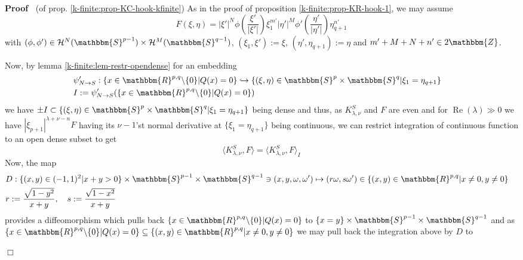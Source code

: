 \documentclass{article}
\newcommand{\assign}{:=}
\newcommand{\tmop}[1]{\ensuremath{\operatorname{#1}}}
\newenvironment{proof}{\noindent\textbf{Proof\ }}{\hspace*{\fill}$\Box$\medskip}
\numberwithin{definition}{section}
\numberwithin{lemma}{section}
\numberwithin{proposition}{section}
{\theorembodyfont{\rmfamily}\newtheorem{remark}{Remark}
\numberwithin{remark}{section}
}
\begin{document}
\begin{proof}
  (of prop. \ref{k-finite:prop-KC-hook-kfinite}) As in the proof of
  proposition \ref{k-finite:prop-KR-hook-1}, we may assume
  \[ F ( \xi, \eta) = | \xi' |^N \phi \left( \frac{\xi'}{| \xi' |} \right)
     \xi_1^{m'} | \eta' |^M \phi' \left( \frac{\eta'}{| \eta' |} \right)
     \eta_{q + 1}^{n'} \]
  with $( \phi, \phi') \in \mathcal{H}^N ( \mathbbm{S}^{p - 1}) \times
  \mathcal{H}^M ( \mathbbm{S}^{q - 1})$, $( \xi_1, \xi') \assign \xi$, $(
  \eta', \eta_{q + 1}) \assign \eta$ and $m' + M + N + n' \in 2\mathbbm{Z}$.
  
  Now, by lemma \ref{k-finite:lem-restr-opendense} for an embedding
  \begin{eqnarray}
    & \psi_{N \rightarrow S}' : \{ x \in \mathbbm{R}^{p, q} \backslash \{ 0
    \} | Q ( x) = 0 \} \hookrightarrow \{ ( \xi, \eta) \in \mathbbm{S}^p
    \times \mathbbm{S}^q | \xi_1 = \eta_{q + 1} \} &  \nonumber\\
    & I \assign \psi'_{N \rightarrow S} ( \{ x \in \mathbbm{R}^{p, q}
    \backslash \{ 0 \} | Q ( x) = 0 \}) &  \nonumber
  \end{eqnarray}
  we have $\pm I \subset \{ ( \xi, \eta) \in \mathbbm{S}^p \times
  \mathbbm{S}^q | \xi_1 = \eta_{q + 1} \}$ being dense and thus, as
  $K_{\lambda, \nu}^S$ and $F$ are even and for $\tmop{Re} ( \lambda) \gg 0$
  we have $| \xi_{p + 1} |^{\lambda + \nu - n} F$ having its $\nu - 1$'st
  normal derivative at $\{ \xi_1 = \eta_{q + 1} \}$ being continuous, we can
  restrict integration of continuous function to an open dense subset to get
  \[ \langle K_{\lambda, \nu}^S, F \rangle = \langle K_{\lambda, \nu}^S, F
     \rangle_I \]
  Now, the map
  \begin{eqnarray}
    & D : \{ ( x, y) \in ( - 1, 1)^2 | x + y > 0 \} \times \mathbbm{S}^{p -
    1} \times \mathbbm{S}^{q - 1} \ni ( x, y, \omega, \omega') \mapsto ( r
    \omega, s \omega') \in \{ ( x, y) \in \mathbbm{R}^{p, q} | x \neq 0, y
    \neq 0 \} &  \nonumber\\
    & r : = \frac{\sqrt{1 - y^2}}{x + y}, \hspace{1em} s : = \frac{\sqrt{1 -
    x^2}}{x + y} &  \nonumber
  \end{eqnarray}
  provides a diffeomorphism which pulls back $\{ x \in \mathbbm{R}^{p, q}
  \backslash \{ 0 \} | Q ( x) = 0 \}$ to $\{ x = y \} \times \mathbbm{S}^{p -
  1} \times \mathbbm{S}^{q - 1}$ and as $\{ x \in \mathbbm{R}^{p, q}
  \backslash \{ 0 \} | Q ( x) = 0 \} \subseteq \{ ( x, y) \in \mathbbm{R}^{p,
  q} | x \neq 0, y \neq 0 \}$ we may pull back the integration above by $D$ to

\end{proof}
\end{document}
